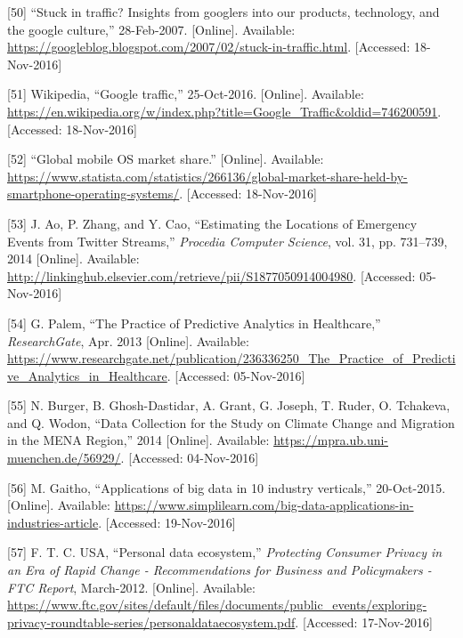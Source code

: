 \documentclass[12pt,english,a4paper,titlepage,cleardoublepage=empty,dottedtoc]{report}
\begin{document}
\hypertarget{ref-web_2007_introducing-google-traffic}{}
{[}50{]} ``Stuck in traffic? Insights from googlers into our products,
technology, and the google culture,'' 28-Feb-2007. {[}Online{]}.
Available:
\url{https://googleblog.blogspot.com/2007/02/stuck-in-traffic.html}.
{[}Accessed: 18-Nov-2016{]}

\hypertarget{ref-web_2016_wikipedia_google-traffic}{}
{[}51{]} Wikipedia, ``Google traffic,'' 25-Oct-2016. {[}Online{]}.
Available:
\url{https://en.wikipedia.org/w/index.php?title=Google_Traffic\&oldid=746200591}.
{[}Accessed: 18-Nov-2016{]}

\hypertarget{ref-graphic_2016_global-mobile-os-market-share}{}
{[}52{]} ``Global mobile OS market share.'' {[}Online{]}. Available:
\url{https://www.statista.com/statistics/266136/global-market-share-held-by-smartphone-operating-systems/}.
{[}Accessed: 18-Nov-2016{]}

\hypertarget{ref-estimating-the-locations-of-emergency-events-from-twitter-streams_2014}{}
{[}53{]} J. Ao, P. Zhang, and Y. Cao, ``Estimating the Locations of
Emergency Events from Twitter Streams,'' \emph{Procedia Computer
Science}, vol. 31, pp. 731--739, 2014 {[}Online{]}. Available:
\url{http://linkinghub.elsevier.com/retrieve/pii/S1877050914004980}.
{[}Accessed: 05-Nov-2016{]}

\hypertarget{ref-the-practice-of-predictive-analytics-in-healthcare_2013}{}
{[}54{]} G. Palem, ``The Practice of Predictive Analytics in
Healthcare,'' \emph{ResearchGate}, Apr. 2013 {[}Online{]}. Available:
\url{https://www.researchgate.net/publication/236336250_The_Practice_of_Predictive_Analytics_in_Healthcare}.
{[}Accessed: 05-Nov-2016{]}

\hypertarget{ref-data-collection-for-climate-changes_2014}{}
{[}55{]} N. Burger, B. Ghosh-Dastidar, A. Grant, G. Joseph, T. Ruder, O.
Tchakeva, and Q. Wodon, ``Data Collection for the Study on Climate
Change and Migration in the MENA Region,'' 2014 {[}Online{]}. Available:
\url{https://mpra.ub.uni-muenchen.de/56929/}. {[}Accessed:
04-Nov-2016{]}

\hypertarget{ref-graphic_2015_applications-of-big-data-in-10-industry-verticals}{}
{[}56{]} M. Gaitho, ``Applications of big data in 10 industry
verticals,'' 20-Oct-2015. {[}Online{]}. Available:
\url{https://www.simplilearn.com/big-data-applications-in-industries-article}.
{[}Accessed: 19-Nov-2016{]}

\hypertarget{ref-graphic_2012_personal-data-ecosystem}{}
{[}57{]} F. T. C. USA, ``Personal data ecosystem,'' \emph{Protecting
Consumer Privacy in an Era of Rapid Change - Recommendations for
Business and Policymakers - FTC Report}, March-2012. {[}Online{]}.
Available:
\url{https://www.ftc.gov/sites/default/files/documents/public_events/exploring-privacy-roundtable-series/personaldataecosystem.pdf}.
{[}Accessed: 17-Nov-2016{]}
\end{document}
